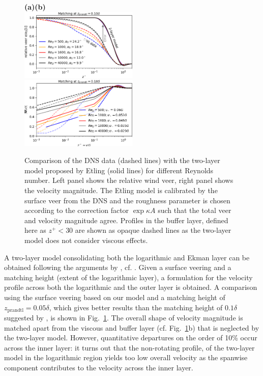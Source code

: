 \documentclass[smallcondensed,final]{svjour3}
\begin{document}
\begin{figure}
  \textbf{(a)\hspace{0.48\textwidth}(b)}\\[-0.15em]
  \includegraphics[width=0.5\textwidth]{Fig12a.eps} %
  \includegraphics[width=0.5\textwidth]{Fig12b.eps} %
  \caption{Comparison of the DNS data (dashed lines) with the two-layer model proposed by Etling (solid lines) for different Reynolds number. Left panel shows the relative wind veer, right panel shows the velocity magnitude. The Etling model is calibrated by the surface veer from the DNS and the roughness parameter is chosen according to the correction factor $\exp{\kappa A}$ such that the total veer and velocity magnitude agree. Profiles in the buffer layer, defined here as $z^+<30$ are shown as opaque dashed lines as the two-layer model does not consider viscous effects.}
  \label{fig:etling} 
\end{figure}
A two-layer model consolidating both the logarithmic and Ekman layer can be obtained following the arguments by \cite{etling:2008}, cf. \cite{emeis:2018}. Given a surface veering and a matching height (extent of the logarithmic layer), a formulation for the velocity profile across both the logarithmic and the outer layer is obtained. A comparison using the surface veering based on our model and a matching height of $z_\text{prandtl}=0.05\delta$, which gives better results than the matching height of $0.1\delta$ suggested by \cite{etling:2008}, is shown in Fig.~\ref{fig:etling}. 
% 
The overall shape of velocity magnitude is matched apart from the viscous and buffer layer (cf. Fig.~\ref{fig:etling}b) that is neglected by the two-layer model. However, quantitative departures on the order of 10\% occur across the inner layer: it turns out that the non-rotating profile, of the two-layer model in the logarithmic region yields too low overall velocity as the spanwise component contributes to the velocity across the inner layer. 
\end{document}
